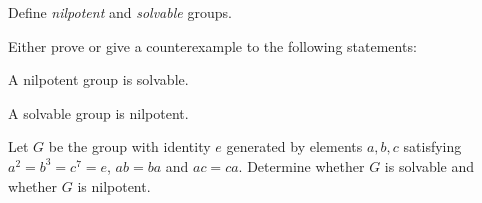 \begin{alist}
\item Define \emph{nilpotent} and \emph{solvable} groups.
\item Either prove or give a counterexample to the following
statements:
\begin{rlist}
\item A nilpotent group is solvable.
\item A solvable group is nilpotent.
\end{rlist}
\item Let $G$ be the group with identity $e$ generated by elements
$a,b,c$ satisfying $a^2=b^3=c^7=e$, $ab=ba$ and $ac=ca$. Determine
whether $G$ is solvable and whether $G$ is nilpotent.
\end{alist}


